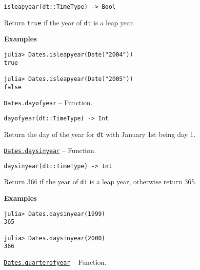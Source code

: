 \begin{adjustwidth}{2em}{0pt}


\begin{verbatim}
isleapyear(dt::TimeType) -> Bool
\end{verbatim}

Return \texttt{true} if the year of \texttt{dt} is a leap year.

\textbf{Examples}


\begin{verbatim}
julia> Dates.isleapyear(Date("2004"))
true

julia> Dates.isleapyear(Date("2005"))
false
\end{verbatim}



\end{adjustwidth}
\hypertarget{4496651838489546625}{}
\hyperlink{4496651838489546625}{\texttt{Dates.dayofyear}}  -- {Function.}

\begin{adjustwidth}{2em}{0pt}


\begin{verbatim}
dayofyear(dt::TimeType) -> Int
\end{verbatim}

Return the day of the year for \texttt{dt} with January 1st being day 1.



\end{adjustwidth}
\hypertarget{11086128603918251845}{}
\hyperlink{11086128603918251845}{\texttt{Dates.daysinyear}}  -- {Function.}

\begin{adjustwidth}{2em}{0pt}


\begin{verbatim}
daysinyear(dt::TimeType) -> Int
\end{verbatim}

Return 366 if the year of \texttt{dt} is a leap year, otherwise return 365.

\textbf{Examples}


\begin{verbatim}
julia> Dates.daysinyear(1999)
365

julia> Dates.daysinyear(2000)
366
\end{verbatim}



\end{adjustwidth}
\hypertarget{6690591772267933900}{}
\hyperlink{6690591772267933900}{\texttt{Dates.quarterofyear}}  -- {Function.}

